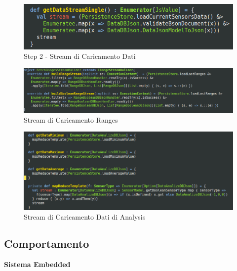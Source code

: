 \begin{figure}[h]
\centering
\includegraphics[scale=0.5,natwidth=610,natheight=642]{Figures/Project/Server/Interaction/LoadDataStream/LoadDataStream2.png}
\caption{Step 2 - Stream di Caricamento Dati}
\label{LoadDataStream2}
\end{figure}

\begin{figure}[h]
\centering
\includegraphics[scale=0.3,natwidth=610,natheight=642]{Figures/Project/Server/Interaction/RangeLoadStream/RangeLoadStream.png}
\caption{Stream di Caricamento Ranges}
\label{LoadRangeStream}
\end{figure}

\begin{figure}[h]
\centering
\includegraphics[scale=0.3,natwidth=610,natheight=642]{Figures/Project/Server/Interaction/AnalysisLoadStream/AnalysisLoadStream.png}
\caption{Stream di Caricamento Dati di Analysis}
\label{AnalysisRangeStream}
\end{figure}


\afterpage{\clearpage}

\newpage

\subsection{Comportamento}

\begin{center}
  \textbf{Sistema Embedded}
\end{center}

